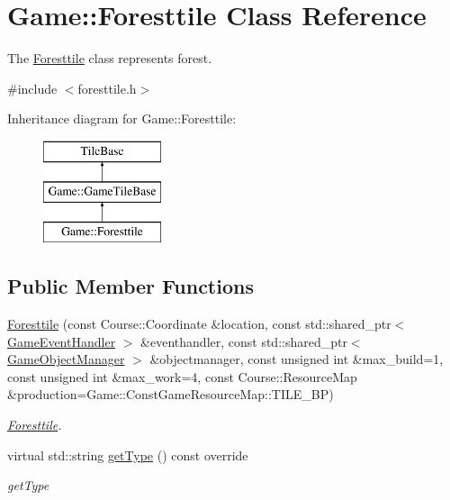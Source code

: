 \hypertarget{class_game_1_1_foresttile}{\section{Game\-:\-:Foresttile Class Reference}
\label{class_game_1_1_foresttile}
}


The \hyperlink{class_game_1_1_foresttile}{Foresttile} class represents forest.  




{\ttfamily \#include $<$foresttile.\-h$>$}

Inheritance diagram for Game\-:\-:Foresttile\-:\begin{figure}[H]
\begin{center}
\leavevmode
\includegraphics[height=3.000000cm]{class_game_1_1_foresttile}
\end{center}
\end{figure}
\subsection*{Public Member Functions}
\begin{DoxyCompactItemize}
\item 
\hyperlink{class_game_1_1_foresttile_a708533830b5f1255c679dd76baecea0a}{Foresttile} (const Course\-::\-Coordinate \&location, const std\-::shared\-\_\-ptr$<$ \hyperlink{class_game_1_1_game_event_handler}{Game\-Event\-Handler} $>$ \&eventhandler, const std\-::shared\-\_\-ptr$<$ \hyperlink{class_game_1_1_game_object_manager}{Game\-Object\-Manager} $>$ \&objectmanager, const unsigned int \&max\-\_\-build=1, const unsigned int \&max\-\_\-work=4, const Course\-::\-Resource\-Map \&production=Game\-::\-Const\-Game\-Resource\-Map\-::\-T\-I\-L\-E\-\_\-\-B\-P)
\begin{DoxyCompactList}\small\item\em \hyperlink{class_game_1_1_foresttile}{Foresttile}. \end{DoxyCompactList}\item 
virtual std\-::string \hyperlink{class_game_1_1_foresttile_a126210f53c011a036515963ef1216272}{get\-Type} () const override
\begin{DoxyCompactList}\small\item\em get\-Type \end{DoxyCompactList}\end{DoxyCompactItemize}
